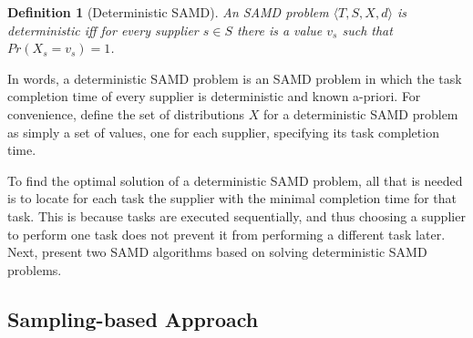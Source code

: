 \documentclass[letterpaper]{article} %
\newtheorem{definition}{Definition}
\newcommand{\tuple}[1]{\langle#1\rangle}
\newcommand{\samd}{\ac{SAMD}\xspace}
\newcommand{\sampling}{\textsc{Sampling}\xspace}
\begin{document}
\begin{definition}[Deterministic \samd]
An \samd problem $\tuple{T, S, X, d}$ is \emph{deterministic}
iff for every supplier $s\in S$ there is a value $v_s$ such that $Pr(X_s=v_s)=1$.
\label{def:deterministic}
\end{definition}
In words, a deterministic \samd problem is an \samd problem in which the task completion time of every supplier is deterministic and known a-priori. %
For convenience,  define the set of distributions $X$
for a deterministic \samd problem as simply a set of values, one for each supplier, specifying its task completion time. %

To find the optimal solution of a deterministic \samd problem, all that is needed is to locate for each task the supplier with the minimal completion time for that task. This is because tasks are executed sequentially, and thus choosing a supplier to perform one task does not prevent it from performing a different task later. Next,  present two \samd algorithms based on solving deterministic \samd problems.




\subsection{Sampling-based Approach}\label{sec:sampling}


\end{document}
